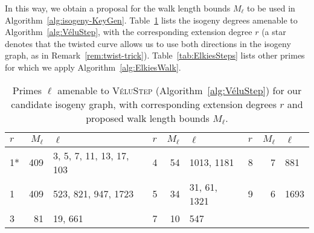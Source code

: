 \documentclass{llncs}
\newcommand{\algstyle}[1]{\textsc{#1}}
\begin{document}
In this way, we obtain a proposal for the walk length bounds $M_\ell$
to be used in Algorithm~\ref{alg:isogeny-KeyGen}. Table~\ref{tab:VéluSteps}
lists the isogeny degrees amenable to Algorithm~\ref{alg:VéluStep}, with
the corresponding extension degree $r$ 
(a star denotes that the twisted curve
allows us to use both directions in the isogeny graph,
as in Remark~\ref{rem:twist-trick}).
Table~\ref{tab:ElkiesSteps}
lists other primes for which we apply Algorithm~\ref{alg:ElkiesWalk}.

\begin{table}
    \centering
    \begin{tabular}{l|@{\;}r@{\;}|@{\;}l@{\;}||l|@{\;}r@{\;}|@{\;}l@{\;}||@{\;}l|r@{\;}|@{\;}l}
        $r$ & $M_\ell$ & $\ell$
        &
        $r$ & $M_\ell$ & $\ell$
        &
        $r$ & $M_\ell$ & $\ell$
        \\
        \hline
        1* & 409 & 3, 5, 7, 11, 13, 17, 103
        &
        4 & 54 & 1013, 1181
        &
        8 & 7 & 881
        \\
        1 & 409 & 523, 821, 947, 1723
        &
        5 & 34 & 31, 61, 1321
        &
        9 & 6 & 1693
        \\
        3 & 81 & 19, 661
        &
        7 & 10 & 547
        \\
        \hline
    \end{tabular}
    \smallskip
    \caption{Primes $\ell$ amenable to \algstyle{VéluStep}
    (Algorithm~\ref{alg:VéluStep}) for our candidate isogeny graph,
    with corresponding extension degrees $r$ 
    and proposed walk length bounds $M_\ell$.}
    \label{tab:VéluSteps}
\end{table}

%
\end{document}

